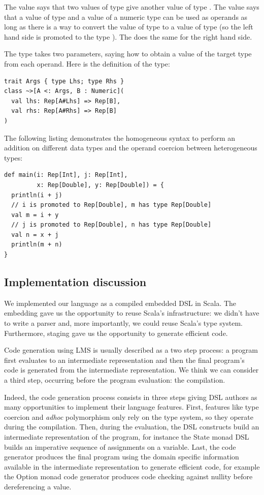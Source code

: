 \documentclass[american,english,runningheads]{llncs}
\begin{document}
The  value says that two values of type  give another value of type . The  value says that a value of type  and a value of a numeric type  can be used as operands as long as there is a way to convert the value of type  to a value of type  (so the left hand side is promoted to the type ). The  does the same for the right hand side.

The \code{\~\>} type takes two parameters, saying how to obtain a value of the target type from each operand. Here is the definition of the \code{\~\>} type:

\begin{lstlisting}
trait Args { type Lhs; type Rhs }
class ~>[A <: Args, B : Numeric](
  val lhs: Rep[A#Lhs] => Rep[B],
  val rhs: Rep[A#Rhs] => Rep[B]
)
\end{lstlisting}

The following listing demonstrates the homogeneous syntax to perform an addition on different data types and the operand coercion between heterogeneous types:

\begin{lstlisting}
def main(i: Rep[Int], j: Rep[Int],
         x: Rep[Double], y: Rep[Double]) = {
  println(i + j)
  // i is promoted to Rep[Double], m has type Rep[Double]
  val m = i + y
  // j is promoted to Rep[Double], n has type Rep[Double]
  val n = x + j
  println(m + n)
}
\end{lstlisting}

\subsection{Implementation discussion}

We implemented our language as a compiled embedded DSL in Scala. The embedding gave us the opportunity to reuse Scala’s infrastructure: we didn’t have to write a parser and, more importantly, we could reuse Scala’s type system. Furthermore, staging gave us the opportunity to generate efficient code.

Code generation using LMS is usually described as a two step process: a program first evaluates to an intermediate representation and then the final program’s code is generated from the intermediate representation. We think we can consider a third step, occurring before the program evaluation: the compilation.

Indeed, the code generation process consists in three steps giving DSL authors as many opportunities to implement their language features. First, features like type coercion and \emph{adhoc} polymorphism only rely on the type system, so they operate during the compilation. Then, during the evaluation, the DSL constructs build an intermediate representation of the program, for instance the State monad DSL builds an imperative sequence of assignments on a variable. Last, the code generator produces the final program using the domain specific information available in the intermediate representation to generate efficient code, for example the Option monad code generator produces code checking against nullity before dereferencing a value.
\end{document}
